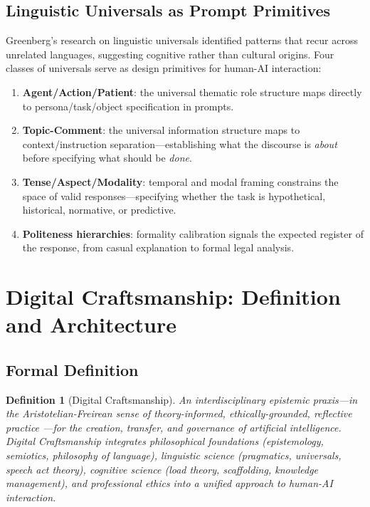 \documentclass[12pt,a4paper]{article}
\newtheorem{definition}{Definition}[section]
\begin{document}
\subsection{Linguistic Universals as Prompt Primitives}

Greenberg's research on linguistic universals \cite{greenberg1963} identified patterns that recur across unrelated languages, suggesting cognitive rather than cultural origins. Four classes of universals serve as design primitives for human-AI interaction:

\begin{enumerate}
  \item \textbf{Agent/Action/Patient}: the universal thematic role structure maps directly to persona/task/object specification in prompts.
  \item \textbf{Topic-Comment}: the universal information structure maps to context/instruction separation---establishing what the discourse is \emph{about} before specifying what should be \emph{done}.
  \item \textbf{Tense/Aspect/Modality}: temporal and modal framing constrains the space of valid responses---specifying whether the task is hypothetical, historical, normative, or predictive.
  \item \textbf{Politeness hierarchies}: formality calibration signals the expected register of the response, from casual explanation to formal legal analysis.
\end{enumerate}


\section{Digital Craftsmanship: Definition and Architecture}
\label{sec:craftsmanship}

\subsection{Formal Definition}

\begin{definition}[Digital Craftsmanship]
\label{def:dc}
An interdisciplinary \emph{epistemic praxis}---in the Aristotelian-Freirean sense of theory-informed, ethically-grounded, reflective practice \cite{freire1970}---for the creation, transfer, and governance of artificial intelligence. Digital Craftsmanship integrates philosophical foundations (epistemology, semiotics, philosophy of language), linguistic science (pragmatics, universals, speech act theory), cognitive science (load theory, scaffolding, knowledge management), and professional ethics into a unified approach to human-AI interaction.
\end{definition}
\end{document}
